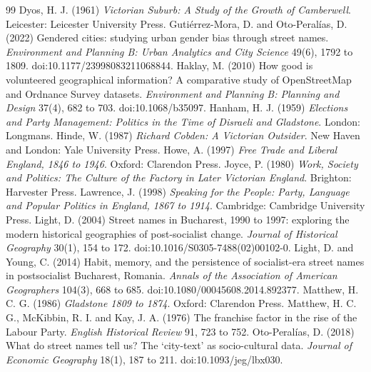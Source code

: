 \documentclass[11pt,a4paper]{article}
\begin{document}
\begin{thebibliography}{99}
 Dyos, H. J. (1961) \textit{Victorian Suburb: A Study of the Growth of Camberwell}. Leicester: Leicester University Press.
 Gutiérrez-Mora, D. and Oto-Peralías, D. (2022) Gendered cities: studying urban gender bias through street names. \textit{Environment and Planning B: Urban Analytics and City Science} 49(6), 1792 to 1809. doi:10.1177/23998083211068844.
 Haklay, M. (2010) How good is volunteered geographical information? A comparative study of OpenStreetMap and Ordnance Survey datasets. \textit{Environment and Planning B: Planning and Design} 37(4), 682 to 703. doi:10.1068/b35097.
 Hanham, H. J. (1959) \textit{Elections and Party Management: Politics in the Time of Disraeli and Gladstone}. London: Longmans.
 Hinde, W. (1987) \textit{Richard Cobden: A Victorian Outsider}. New Haven and London: Yale University Press.
 Howe, A. (1997) \textit{Free Trade and Liberal England, 1846 to 1946}. Oxford: Clarendon Press.
 Joyce, P. (1980) \textit{Work, Society and Politics: The Culture of the Factory in Later Victorian England}. Brighton: Harvester Press.
 Lawrence, J. (1998) \textit{Speaking for the People: Party, Language and Popular Politics in England, 1867 to 1914}. Cambridge: Cambridge University Press.
 Light, D. (2004) Street names in Bucharest, 1990 to 1997: exploring the modern historical geographies of post-socialist change. \textit{Journal of Historical Geography} 30(1), 154 to 172. doi:10.1016/S0305-7488(02)00102-0.
 Light, D. and Young, C. (2014) Habit, memory, and the persistence of socialist-era street names in postsocialist Bucharest, Romania. \textit{Annals of the Association of American Geographers} 104(3), 668 to 685. doi:10.1080/00045608.2014.892377.
 Matthew, H. C. G. (1986) \textit{Gladstone 1809 to 1874}. Oxford: Clarendon Press.
 Matthew, H. C. G., McKibbin, R. I. and Kay, J. A. (1976) The franchise factor in the rise of the Labour Party. \textit{English Historical Review} 91, 723 to 752.
 Oto-Peralías, D. (2018) What do street names tell us? The `city-text' as socio-cultural data. \textit{Journal of Economic Geography} 18(1), 187 to 211. doi:10.1093/jeg/lbx030.

\end{thebibliography}
\end{document}
